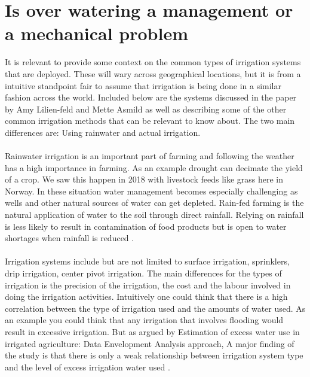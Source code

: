 \documentclass[]{uiophd}
\begin{document}
\section{Is over watering a management or a mechanical problem}

It is relevant to provide some context on the common types of irrigation systems that are deployed. These will wary across geographical locations, but it is from a intuitive standpoint fair to assume that irrigation is being done in a similar fashion across the world. Included below are the systems discussed in the paper by  Amy Lilien-feld and Mette Asmild as well as describing some of the  other common irrigation methods that can be relevant to know about. The two main differences are: Using rainwater and actual irrigation. 
\\\\
Rainwater irrigation is an important part of farming and following the weather has a high importance in farming. As an example drought can decimate the yield of a crop. We saw this happen in 2018 with livestock feeds like grass here in Norway. In these situation water management becomes especially challenging as wells and other natural sources of water can get depleted. Rain-fed farming is the natural application of water to the soil through direct rainfall. Relying on rainfall is less likely to result in contamination of food products but is open to water shortages when rainfall is reduced \cite{cdc}.
\\\\
Irrigation systems include but are not limited to surface irrigation, sprinklers, drip irrigation, center pivot irrigation. The main differences for the types of irrigation is the precision of the irrigation, the cost and the labour involved in doing the irrigation activities. Intuitively one could think that there is a high correlation between the type of irrigation used and the amounts of water used. As an example you could think that any irrigation that involves flooding would result in excessive irrigation. But as argued by Estimation of excess water use in irrigated agriculture: Data Envelopment Analysis approach, A major finding of the study is that there is only a weak relationship between irrigation system type and the level of excess irrigation water used \cite{LILIENFELD200773}.
\\\\
\end{document}
